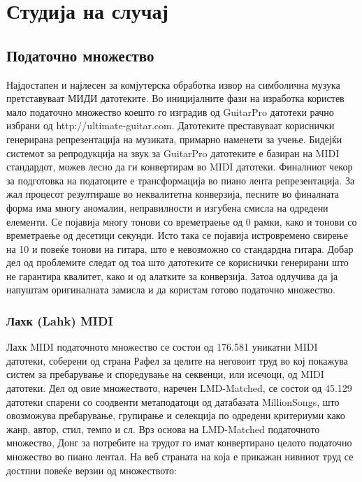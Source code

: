 \chapter{Студија на случај}
\label{ch:studija}

\section{Податочно множество}

Најдостапен и најлесен за комјутерска обработка извор на симболична музука претставуваат МИДИ датотеките. Во иницијалните фази на изработка користев мало податочно множество коешто го изградив од GuitarPro датотеки рачно избрани од http://ultimate-guitar.com. Датотеките преставуваат кориснички генерирана репрезентација на музиката, примарно наменети за учење. Бидејќи системот за репродукција на звук за GuitarPro датотеките е базиран на MIDI стандардот, можев лесно да ги конвертирам во MIDI датотеки. Финалниот чекор за подготовка на податоците е трансформација во пиано лента репрезентација. За жал процесот резултираше во неквалитетна конверзија, песните во финалната форма има многу аномалии, неправилности и изгубена смисла на одредени елементи. Се појавија многу тонови со времетраење од 0 рамки, како и тонови со времетраење од десетици секунди. Исто така се појавија истровремено свирење на 10 и повеќе тонови на гитара, што е невозможно со стандардна гитара. Добар дел од проблемите следат од тоа што датотеките се кориснички генерирани што не гарантира квалитет, како и од алатките за конверзија. Затоа одлучива да ја напуштам оригиналната замисла и да користам готово податочно множество.

\subsection{Лахк (Lahk) MIDI}

Лахк MIDI податочното множество се состои од 176.581 уникатни MIDI датотеки, соберени од страна Рафел за целите на неговоит труд \cite{Raffel2016} во кој покажува систем за пребарување и споредување на секвенци, или исечоци, од MIDI датотеки. Дел од овие множеството, наречен LMD-Matched, се состои од 45.129 датотеки спарени со соодвенти метаподатоци од датабазата MillionSongs, што овозможува пребарување, групирање и селекција по одредени критериуми како жанр, автор, стил, темпо и сл. 
Врз основа на LMD-Matched податочното множество, Донг за потребите на трудот \cite{Dong2017} го имат конвертирано целото податочно множество во пиано лентал. На веб страната на која е прикажан нивниот труд се достпни повеќе верзии од множеството:

